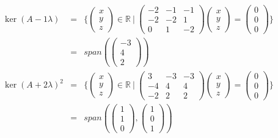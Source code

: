 \documentclass[10pt,a4paper]{article}
\begin{document}
\begin{eqnarray*}
	\ker(A- 1\lambda) &=& \{
	\begin{pmatrix}
		x\\y\\z
	\end{pmatrix} \in\mathbb{R} \ | \
	\begin{pmatrix}
	-2 & -1 & -1\\
	-2 & -2 & 1\\
	0 & 1 & -2
	\end{pmatrix} \begin{pmatrix}
		x\\y\\z
	\end{pmatrix}
	= \begin{pmatrix}
	0\\0\\0
	\end{pmatrix} \}\\
	&=& span(\begin{pmatrix}
		-3\\4\\2
	\end{pmatrix})\\
		\ker(A+2\lambda)^2 &=& \{
	\begin{pmatrix}
		x\\y\\z
	\end{pmatrix} \in\mathbb{R} \ | \
	\begin{pmatrix}
	3 & -3 & -3\\
	-4 & 4 & 4\\
	-2 & 2 & 2
	\end{pmatrix} \begin{pmatrix}
		x\\y\\z
	\end{pmatrix}
	= \begin{pmatrix}
	0\\0\\0
	\end{pmatrix} \}\\
	&=& span(\begin{pmatrix}
		1\\1\\0
	\end{pmatrix},
	\begin{pmatrix}
		1\\0\\1
	\end{pmatrix})\\
\end{eqnarray*}
\end{document}
